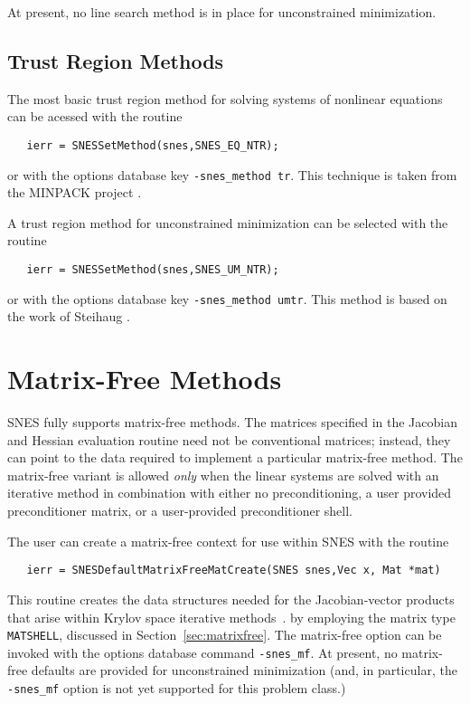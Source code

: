 At present, no line search method is in place for unconstrained minimization.

\subsection{Trust Region Methods}

The most basic trust region method for solving systems of nonlinear equations
can be acessed with the routine
\begin{verbatim}
   ierr = SNESSetMethod(snes,SNES_EQ_NTR);
\end{verbatim}
or with the options database key {\tt -snes\_method tr}. 
This technique is taken from the MINPACK project
\cite{more84}.

A trust region method for unconstrained minimization can be selected with
the routine
\begin{verbatim}
   ierr = SNESSetMethod(snes,SNES_UM_NTR);
\end{verbatim}
or with the options database key {\tt -snes\_method umtr}. 
This method is based on the work of Steihaug \cite{steihaug:83}.

\section{Matrix-Free Methods}
\label{sec:nlmatrixfree}

SNES fully supports matrix-free methods. The matrices specified in the
Jacobian and Hessian evaluation routine need not be conventional matrices;
instead, they can point to the data required to implement a particular
matrix-free method.  The matrix-free variant is allowed {\em only}
when the linear systems are solved with an iterative method in
combination with either no preconditioning, a user provided 
preconditioner matrix, or a user-provided
preconditioner shell.  

The user can create a matrix-free context for use within SNES with 
the routine
\begin{verbatim}
   ierr = SNESDefaultMatrixFreeMatCreate(SNES snes,Vec x, Mat *mat)
\end{verbatim}
This routine creates the data structures needed for the Jacobian-vector 
products that arise within Krylov space iterative methods~\cite{brownsaad:90}.
by employing the matrix type {\tt MATSHELL}, 
discussed in Section~\ref{sec:matrixfree}.  
The matrix-free option can be invoked with the options database 
command {\tt -snes\_mf}. 
At present, no matrix-free defaults are provided for unconstrained
minimization (and, in particular, the {\tt -snes\_mf} option is not 
yet supported for this problem class.)

